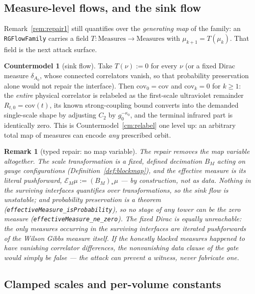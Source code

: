 \documentclass[11pt]{article}
\newtheorem{remark}[theorem]{Remark}
\theoremstyle{definition}
\newtheorem{countermodel}[theorem]{Countermodel}
\newcommand{\lean}[1]{\texttt{#1}}
\begin{document}
\subsection{Measure-level flows, and the sink flow}\label{sec:cm2}

Remark~\ref{rem:repair1} still quantifies over the \emph{generating
map} of the family: an \lean{RGFlowFamily} carries a field
$T : \mathrm{Measures} \to \mathrm{Measures}$ with
$\mu_{k+1} = T(\mu_k)$.  That field is the next attack surface.

\begin{countermodel}[sink flow]\label{cm:sink}
Take $T(\nu) := 0$ for every $\nu$ (or a fixed Dirac measure
$\delta_{A_0}$, whose connected correlators vanish, so that
probability preservation alone would not repair the interface).  Then
$\mathrm{cov}_0 = \mathrm{cov}$ and $\mathrm{cov}_k = 0$ for
$k \ge 1$: the \emph{entire} physical correlator is relabeled as the
first-scale ultraviolet remainder $R_{t,0} = \mathrm{cov}(t)$, its
known strong-coupling bound converts into the demanded single-scale
shape by adjusting $C_2$ by $g_0^{-\kappa_0}$, and the terminal
infrared part is identically zero.  This is
Countermodel~\ref{cm:relabel} one level up: an arbitrary total map of
measures can encode \emph{any} prescribed orbit.
\end{countermodel}

\begin{remark}[typed repair: no map variable]\label{rem:repair2}
The repair removes the map variable altogether.  The scale
transformation is a \emph{fixed, defined} decimation
$B_M$ acting on gauge \emph{configurations}
(Definition~\ref{def:blockmap}), and the effective measure is its
literal pushforward, $\mathcal{E}_M \mu := (B_M)_* \mu$ --- by
construction, not as data.  Nothing in the surviving interfaces
quantifies over transformations, so the sink flow is
\emph{unstatable}; and probability preservation is a theorem
(\lean{effectiveMeasure\_isProbability}), so no stage of any tower can
be the zero measure (\lean{effectiveMeasure\_ne\_zero}).  The fixed
Dirac is equally unreachable: the only measures occurring in the
surviving interfaces are iterated pushforwards of the Wilson Gibbs
measure itself.  If the honestly blocked measures happened to have
vanishing correlator differences, the nonvanishing data clause of the
gate would simply be \emph{false} --- the attack can prevent a witness,
never fabricate one.
\end{remark}

\subsection{Clamped scales and per-volume constants}\label{sec:cm3}
\end{document}
